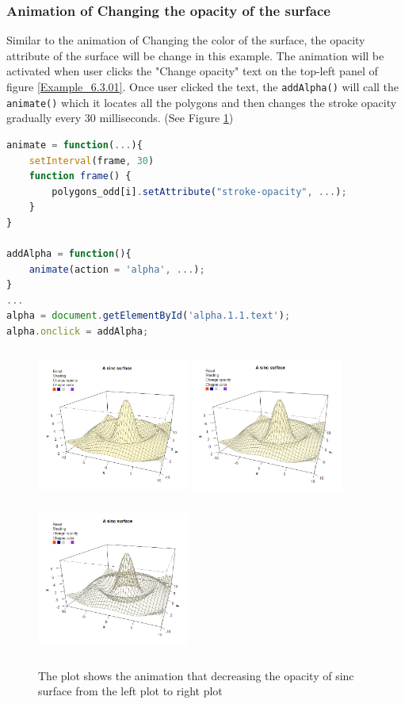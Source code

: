 \documentclass{report}
\begin{document}
\subsubsection*{Animation of Changing the opacity of the surface}
Similar to the animation of Changing the color of the surface, the opacity attribute of the surface will be change in this example. The animation will be activated when user clicks the "Change opacity" text on the top-left panel of figure \ref{Example_6.3.01}. Once user clicked the text, the \texttt{addAlpha()} will call the \texttt{animate()} which it locates all the polygons and then changes the stroke opacity gradually every 30 milliseconds. (See Figure \ref{Example_6.3.2})
\begin{lstlisting}[language = JavaScript]
animate = function(...){
    setInterval(frame, 30)
    function frame() {
        polygons_odd[i].setAttribute("stroke-opacity", ...);
    }
}

addAlpha = function(){
    animate(action = 'alpha', ...);
}
...
alpha = document.getElementById('alpha.1.1.text');
alpha.onclick = addAlpha; 
\end{lstlisting}

\begin{figure}[h]
	\begin{center}
		\includegraphics[height = 5cm, width = 5cm]{figure/svg/origin_1.PNG}
		\includegraphics[height = 5cm, width = 5cm]{figure/svg/opacity_2.PNG}
		\includegraphics[height = 5cm, width = 5cm]{figure/svg/opacity_3.PNG}
		\caption{The plot shows the animation that decreasing the opacity of sinc surface from the left plot to right plot}
		\label{Example_6.3.2}
	\end{center}
\end{figure}
\end{document}
